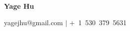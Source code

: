 \documentclass[12pt]{article}
\begin{document}
\begin{center}
    \LARGE
    \textbf{Yage Hu}\par
    \vspace{6pt}
    \small
    yagejhu@gmail.com $|$ +~1~530~379~5631\\
\end{center}





\end{document}

